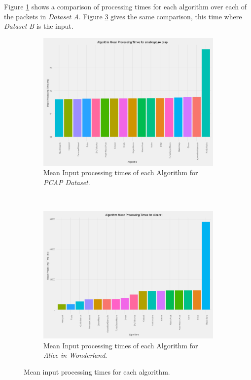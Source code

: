 \documentclass[9pt, technote]{IEEEtran}
\begin{document}
Figure \ref{figure-barmeanprocessingsmallcapture} shows a comparison of processing times for each algorithm over each of the packets in \textit{Dataset A}. Figure \ref{figure-barmeanprocessingalice} gives the same comparison, this time where \textit{Dataset B} is the input.

\begin{figure}[!htb]
    \centering
    \begin{subfigure}[b]{\columnwidth}
        \centering
        \includegraphics[width=\textwidth]{images/bar_graph_mean_one_input_smallcapture_pcap}
        \caption{Mean Input processing times of each Algorithm for \textit{PCAP Dataset}.}
        \label{figure-barmeanprocessingsmallcapture}
    \end{subfigure}
    ~
    \begin{subfigure}[b]{\columnwidth}
        \centering
        \includegraphics[width=\textwidth]{images/bar_graph_mean_one_input_alice_txt} 
        \caption{Mean Input processing times of each Algorithm for \textit{Alice in Wonderland}.}
        \label{figure-barmeanprocessingalice}
    \end{subfigure}
    \caption{Mean input processing times for each algorithm.}
\end{figure}
\end{document}
